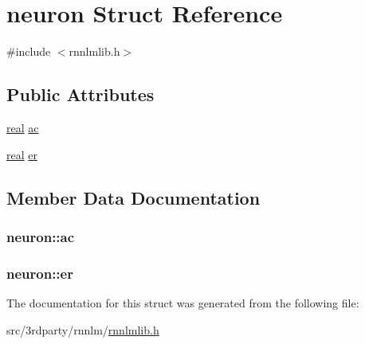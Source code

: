 \hypertarget{structneuron}{}\section{neuron Struct Reference}
\label{structneuron}


{\ttfamily \#include $<$rnnlmlib.\+h$>$}

\subsection*{Public Attributes}
\begin{DoxyCompactItemize}
\item 
\hyperlink{rnnlmlib_8h_a11d147c64891830c9e79b3315b1b2e21}{real} \hyperlink{structneuron_a31c86846302b55ce2184f91cdaaf283e}{ac}
\item 
\hyperlink{rnnlmlib_8h_a11d147c64891830c9e79b3315b1b2e21}{real} \hyperlink{structneuron_a96d6860799aaa121cafe50539710eb0d}{er}
\end{DoxyCompactItemize}


\subsection{Member Data Documentation}
\subsubsection[{ac}]{ neuron\+::ac}\hypertarget{structneuron_a31c86846302b55ce2184f91cdaaf283e}{}\label{structneuron_a31c86846302b55ce2184f91cdaaf283e}
\subsubsection[{er}]{ neuron\+::er}\hypertarget{structneuron_a96d6860799aaa121cafe50539710eb0d}{}\label{structneuron_a96d6860799aaa121cafe50539710eb0d}


The documentation for this struct was generated from the following file\+:\begin{DoxyCompactItemize}
\item 
src/3rdparty/rnnlm/\hyperlink{rnnlmlib_8h}{rnnlmlib.\+h}\end{DoxyCompactItemize}

